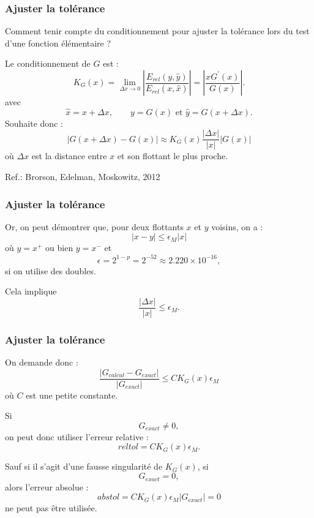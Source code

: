 \documentclass{beamer}
\begin{document}
\begin{frame}[containsverbatim]
\frametitle{Ajuster la tolérance}

Comment tenir compte du conditionnement pour ajuster la tolérance 
lors du test d'une fonction élémentaire ?

Le conditionnement de $G$ est :
$$
K_G(x)
=\lim_{\Delta x \rightarrow 0} \left| \frac{E_{rel}(y,\hat{y})}{E_{rel}(x,\hat{x})}\right|
 = \left| \frac{x G^\prime(x)}{G(x)}\right|.
$$
avec
$$
\hat{x}=x+\Delta x, \qquad y=G(x) \textrm{ et }
\hat{y} = G(x+\Delta x).
$$
Souhaite donc :
$$
|G(x+\Delta x)-G(x)| \approx K_G(x) \frac{|\Delta x|}{|x|} |G(x)|
$$
où $\Delta x$ est la distance entre $x$ et son flottant le plus proche.

Ref.: Brorson, Edelman, Moskowitz, 2012
\end{frame}

\begin{frame}[containsverbatim]
\frametitle{Ajuster la tolérance}

Or, on peut démontrer que, pour deux flottants $x$ et $y$ voisins, 
on a :
$$
|x-y|\leq \epsilon_M |x|
$$
où $y=x^+$ ou bien $y=x^-$ et 
$$
\epsilon=2^{1-p}=2^{-52}\approx 2.220\times 10^{-16},
$$
si on utilise des doubles. 

Cela implique 
$$
\frac{|\Delta x|}{|x|} \leq \epsilon_M.
$$

\end{frame}

\begin{frame}[containsverbatim]
\frametitle{Ajuster la tolérance}
On demande donc :
$$
\frac{|G_{calcul}-G_{exact}|}{|G_{exact}|} \leq C K_G(x) \epsilon_M 
$$
où $C$ est une petite constante. 

Si 
$$
G_{exact} \neq 0,
$$
on peut donc utiliser l'erreur relative :
$$
reltol = C K_G(x) \epsilon_M.
$$


Sauf si il s'agit d'une fausse singularité de $K_G(x)$, si 
$$
G_{exact} = 0,
$$
alors l'erreur absolue :
$$
abstol = C K_G(x) \epsilon_M |G_{exact}| = 0
$$
ne peut pas être utilisée.

\end{frame}
\end{document}
